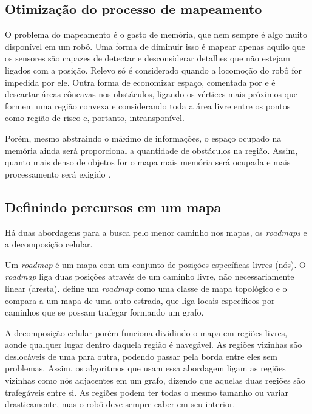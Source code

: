 \subsection{Otimização do processo de mapeamento}

O problema do mapeamento é o gasto de memória, que nem sempre é algo muito disponível em um robô. Uma forma de diminuir isso é mapear apenas aquilo que os sensores são capazes de detectar e desconsiderar detalhes que não estejam ligados com a posição. Relevo só é considerado quando a locomoção do robô for impedida por ele. Outra forma de economizar espaço, comentada por \cite{Siegwart2004} e \cite{Guzman2008} é descartar áreas côncavas nos obstáculos, ligando os vértices mais próximos que formem uma região convexa e considerando toda a área livre entre os pontos como região de risco e, portanto, intransponível.

Porém, mesmo abstraindo o máximo de informações, o espaço ocupado na memória ainda será proporcional a quantidade de obstáculos na região. Assim, quanto mais denso de objetos for o mapa mais memória será ocupada e mais processamento será exigido \cite{Siegwart2004}.

\subsection{Definindo percursos em um mapa}

Há duas abordagens para a busca pelo menor caminho nos mapas, os \textit{roadmaps} e a decomposição celular.

Um \textit{roadmap} é um mapa com um conjunto de posições específicas livres (nós). O \textit{roadmap} liga duas posições através de um caminho livre, não necessariamente linear (aresta). \cite{Choset2005} define um \textit{roadmap} como uma classe de mapa topológico e o compara a um mapa de uma auto-estrada, que liga locais específicos por caminhos que se possam trafegar formando um grafo.

A decomposição celular porém funciona dividindo o mapa em regiões livres, aonde qualquer lugar dentro daquela região é navegável. As regiões vizinhas são deslocáveis de uma para outra, podendo passar pela borda entre eles sem problemas. Assim, os algoritmos que usam essa abordagem ligam as regiões vizinhas como nós adjacentes em um grafo, dizendo que aquelas duas regiões são trafegáveis entre si. As regiões podem ter todas o mesmo tamanho ou variar drasticamente, mas o robô deve sempre caber em seu interior.

